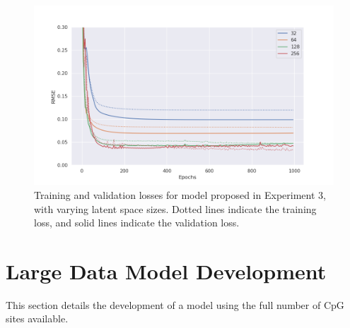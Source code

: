 \documentclass[twocolumn, 9pt]{extarticle}
\begin{document}
\begin{figure}
  \centering
  \includegraphics[width=\columnwidth]{dict_learning_experiments_4.png}
  \caption{Training and validation losses for model proposed in Experiment 3, with varying latent space sizes. Dotted lines indicate the training loss, and solid lines indicate the validation loss.}
  \label{fig:losses_dict_latent_space}
\end{figure}

\section{Large Data Model Development}

This section details the development of a model using the full number of CpG sites available.


\end{document}
